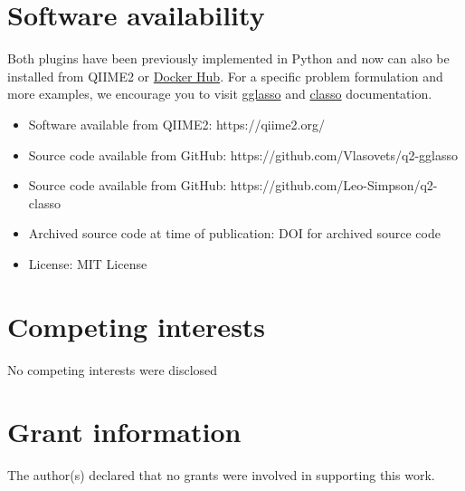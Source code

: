 \documentclass[10pt,a4paper]{article}
\begin{document}
\section*{Software availability}

Both plugins have been previously implemented in Python and now can also be installed from QIIME2 or \href{https://hub.docker.com}{Docker Hub}. For a specific problem formulation and more examples, we encourage you to visit \href{https://gglasso--37.org.readthedocs.build/en/37/getting-started.html}{gglasso} and \href{https://c-lasso.readthedocs.io/en/latest/index.html}{classo} documentation.

\begin{itemize}
	\item Software available from QIIME2: https://qiime2.org/
	\item Source code available from GitHub: https://github.com/Vlasovets/q2-gglasso
    \item Source code available from GitHub: https://github.com/Leo-Simpson/q2-classo
	\item Archived source code at time of publication: DOI for archived source code
	\item License: MIT License
\end{itemize}

\section*{Competing interests}
No competing interests were disclosed

\section*{Grant information}
The author(s) declared that no grants were involved in supporting this work.
\end{document}
